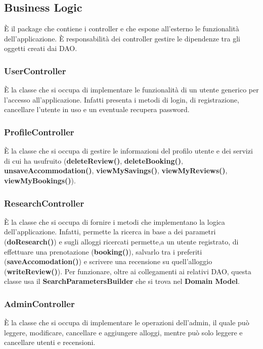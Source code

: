 \documentclass[10pt]{article}
\begin{document}
\subsection{Business Logic}

\`E il package che contiene i controller e che espone all'esterno le funzionalità dell'applicazione. \`E responsabilità dei controller gestire le dipendenze tra gli oggetti creati dai DAO.

\subsubsection{UserController}

\`E la classe che si occupa di implementare le funzionalità di un utente generico per l'accesso all'applicazione. Infatti presenta i metodi di login, di registrazione, cancellare l'utente in uso e un eventuale recupera password.

\subsubsection{ProfileController}

\`E la classe che si occupa di gestire le informazioni del profilo utente e dei servizi di cui ha usufruito (\textbf{deleteReview()}, \textbf{deleteBooking()}, \textbf{unsaveAccommodation()}, \textbf{viewMySavings()}, \textbf{viewMyReviews()}, \textbf{viewMyBookings()}).

\subsubsection{ResearchController}

\`E la classe che si occupa di fornire i metodi che implementano la logica dell'applicazione. Infatti, permette la ricerca in base a dei parametri (\textbf{doResearch()}) e sugli alloggi ricercati permette,a un utente registrato, di effettuare una prenotazione (\textbf{booking()}), salvarlo tra i preferiti (\textbf{saveAccomodation()}) e scrivere una recensione su quell'alloggio (\textbf{writeReview()}). Per funzionare, oltre ai collegamenti ai relativi DAO, questa classe usa il \textbf{SearchParametersBuilder} che si trova nel \textbf{Domain Model}.

\subsubsection{AdminController}

\`E la classe che si occupa di implementare le operazioni dell'admin, il quale può  leggere, modificare, cancellare e aggiungere alloggi, mentre può solo leggere e cancellare utenti e recensioni.
 
\end{document}
